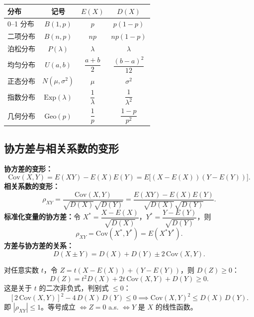 \documentclass[11pt,a4paper]{article}
\begin{document}
\begin{examtip}[常见分布的期望方差速查]
\begin{center}
\begin{tabular}{lccc}
\toprule
分布 & 记号 & $E(X)$ & $D(X)$ \\
\midrule
0--1 分布 & $B(1,p)$ & $p$ & $p(1-p)$ \\
二项分布 & $B(n,p)$ & $np$ & $np(1-p)$ \\
泊松分布 & $P(\lambda)$ & $\lambda$ & $\lambda$ \\
均匀分布 & $U(a,b)$ & $\dfrac{a+b}{2}$ & $\dfrac{(b-a)^2}{12}$ \\
正态分布 & $N(\mu,\sigma^2)$ & $\mu$ & $\sigma^2$ \\
指数分布 & $\mathrm{Exp}(\lambda)$ & $\dfrac{1}{\lambda}$ & $\dfrac{1}{\lambda^2}$ \\
几何分布 & $\mathrm{Geo}(p)$ & $\dfrac{1}{p}$ & $\dfrac{1-p}{p^2}$ \\
\bottomrule
\end{tabular}
\end{center}
\end{examtip}

\subsection{协方差与相关系数的变形}

\begin{variation}[协方差与相关系数的等价形式]
\textbf{协方差的变形：}
\[
\mathrm{Cov}(X,Y) = E(XY)-E(X)E(Y) = E\bigl[(X-E(X))(Y-E(Y))\bigr].
\]
\textbf{相关系数的变形：}
\[
\rho_{XY} = \frac{\mathrm{Cov}(X,Y)}{\sqrt{D(X)}\sqrt{D(Y)}} = \frac{E(XY)-E(X)E(Y)}{\sqrt{D(X)}\sqrt{D(Y)}}.
\]
\textbf{标准化变量的协方差：}令 $X^*=\dfrac{X-E(X)}{\sqrt{D(X)}}$，$Y^*=\dfrac{Y-E(Y)}{\sqrt{D(Y)}}$，则
\[
\rho_{XY} = \mathrm{Cov}(X^*, Y^*) = E(X^* Y^*).
\]
\textbf{方差与协方差的关系：}
\[
D(X\pm Y) = D(X)+D(Y)\pm 2\,\mathrm{Cov}(X,Y).
\]
\end{variation}

\begin{derivation}
对任意实数 $t$，令 $Z=t(X-E(X))+(Y-E(Y))$，则 $D(Z)\geq 0$：
\[
D(Z) = t^2 D(X) + 2t\,\mathrm{Cov}(X,Y) + D(Y) \geq 0.
\]
这是关于 $t$ 的二次非负式，判别式 $\leq 0$：
\[
[2\,\mathrm{Cov}(X,Y)]^2 - 4\,D(X)\,D(Y) \leq 0 \implies \mathrm{Cov}(X,Y)^2 \leq D(X)\,D(Y).
\]
即 $|\rho_{XY}|\leq 1$。等号成立 $\iff Z=0$ a.s. $\iff Y$ 是 $X$ 的线性函数。
\end{derivation}
\end{document}
